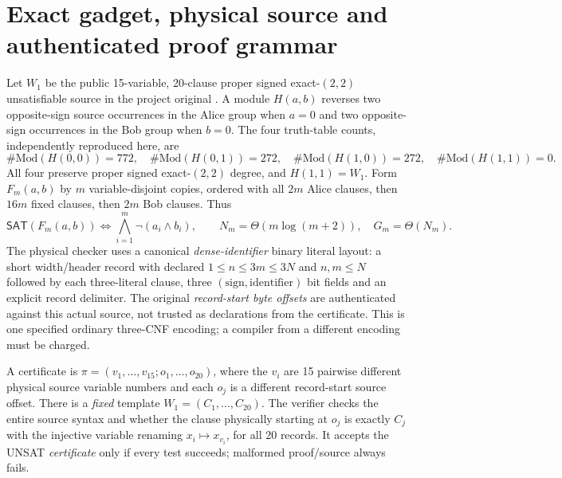 \documentclass[11pt]{article}
\newcommand{\SAT}{\mathsf{SAT}}
\begin{document}
\section{Exact gadget, physical source and authenticated proof grammar}
Let $W_1$ be the public 15-variable, 20-clause proper signed exact-$(2,2)$ unsatisfiable source in the project original . A module $H(a,b)$ reverses two opposite-sign source occurrences in the Alice group when $a=0$ and two opposite-sign occurrences in the Bob group when $b=0$. The four truth-table counts, independently reproduced here, are
\[
\#\mathrm{Mod}(H(0,0))=772,\quad
\#\mathrm{Mod}(H(0,1))=272,\quad
\#\mathrm{Mod}(H(1,0))=272,\quad
\#\mathrm{Mod}(H(1,1))=0.\tag{1}
\]
All four preserve proper signed exact-$(2,2)$ degree, and $H(1,1)=W_1$. Form $F_m(a,b)$ by $m$ variable-disjoint copies, ordered with all $2m$ Alice clauses, then $16m$ fixed clauses, then $2m$ Bob clauses. Thus
\[
\SAT(F_m(a,b))\iff \bigwedge_{i=1}^m \neg(a_i\wedge b_i),\qquad
N_m=\Theta(m\log(m+2)),\quad G_m=\Theta(N_m).\tag{2}
\]
The physical checker uses a canonical \emph{dense-identifier} binary literal layout: a short width/header record with declared $1\le n\le 3m\le3N$ and $n,m\le N$ followed by each three-literal clause, three $(\mathrm{sign},\mathrm{identifier})$ bit fields and an explicit record delimiter. The original \emph{record-start byte offsets} are authenticated against this actual source, not trusted as declarations from the certificate. This is one specified ordinary three-CNF encoding; a compiler from a different encoding must be charged.

A certificate is $\pi=(v_1,\ldots,v_{15}; o_1,\ldots,o_{20})$, where the $v_i$ are 15 pairwise different physical source variable numbers and each $o_j$ is a different record-start source offset. There is a \emph{fixed} template $W_1=(C_1,\ldots,C_{20})$. The verifier checks the entire source syntax and whether the clause physically starting at $o_j$ is exactly $C_j$ with the injective variable renaming $x_i\mapsto x_{v_i}$, for all 20 records. It accepts the UNSAT \emph{certificate} only if every test succeeds; malformed proof/source always fails.
\end{document}
